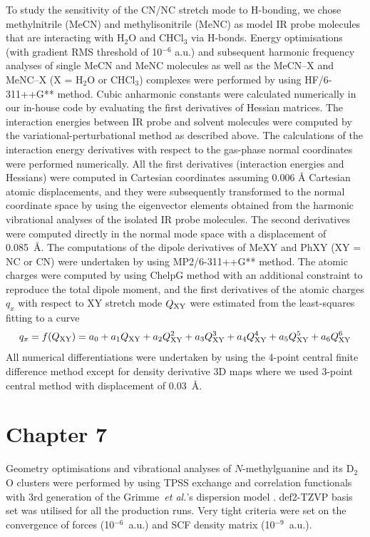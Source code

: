\documentclass[b5paper,oneside,fleqn,11pt]{book}
\begin{document}
\begin{appendices}
\begin{refsection}
To study the sensitivity of the CN/NC stretch mode to H-bonding, we chose methylnitrile
(MeCN) and methylisonitrile (MeNC) as model IR probe molecules that are interacting with 
H$_2$O and CHCl$_3$ via H-bonds. Energy optimisations (with gradient RMS threshold of 10$^{-6}$ a.u.) 
and subsequent harmonic frequency analyses of single MeCN and MeNC molecules as well 
as the MeCN--X and MeNC--X (X = H$_2$O or CHCl$_3$) complexes were performed by using 
HF/6-311++G** method. 
Cubic 
anharmonic constants were calculated numerically in our in\hyp{}house code by evaluating the 
first derivatives of Hessian matrices. The interaction energies between IR probe and solvent 
molecules were computed by the variational\hyp{}perturbational method
as described above. 
The calculations of the interaction energy derivatives with respect 
to the gas\hyp{}phase normal coordinates were performed numerically. All the first derivatives 
(interaction energies and Hessians) were computed in Cartesian coordinates assuming 0.006 \AA
Cartesian atomic displacements, and they were subsequently transformed to the normal 
coordinate space by using the eigenvector elements obtained from the harmonic vibrational 
analyses of the isolated IR probe molecules. The second derivatives were computed directly 
in the normal mode space with a displacement of 0.085~\AA. 
The computations of the dipole derivatives of MeXY and PhXY (XY = NC or CN) were 
undertaken by using MP2/6-311++G** method. 
The atomic charges were computed by 
using ChelpG method \citep{Breneman.Wiberg.JCC.1990} 
with an additional constraint to reproduce the total dipole moment, 
and the first derivatives of the atomic charges $q_x$ with respect to XY 
stretch mode $Q_{\rm XY}$ were estimated from the least\hyp{}squares fitting to a curve 
%
\begin{equation}
q_x=f(Q_{\rm XY}) = a_0 + a_1 Q_{\rm XY}   + a_2 Q_{\rm XY}^2 
                        + a_3 Q_{\rm XY}^3 + a_4 Q_{\rm XY}^4 
                        + a_5 Q_{\rm XY}^5 + a_6 Q_{\rm XY}^6
\end{equation}
%
All numerical differentiations were undertaken by using the 4-point central finite 
difference method except for density derivative 3D maps where we used 3-point central 
method with displacement of 0.03~\AA.

\section{Chapter 7}

Geometry optimisations and vibrational analyses of $N$-methylguanine
and its D$_2$O clusters were performed 
by using TPSS exchange and correlation 
functionals \citep{Tao.Perdew.Staroverov.Scuseria.PhysRevLett.2003} 
with 3rd generation of the Grimme~\emph{et al.}'s 
dispersion model \citep{Grimme.Antony.Ehrlich.Krieg.JCP.2010}.
def2-TZVP basis set \citep{Weigend.Ahlrichs.PCCP.2005,Weigend.PCCP.2006}
was utilised for all the production runs. Very tight criteria
were set on the convergence of forces (10$^{-6}$~a.u.) 
and SCF density matrix (10$^{-9}$~a.u.).


\end{refsection}
\end{appendices}
\end{document}
